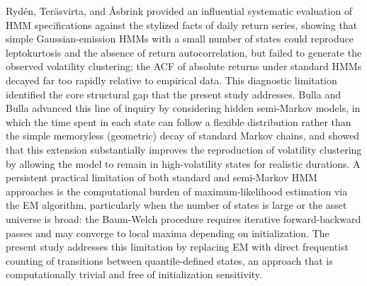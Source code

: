 Ryd\'{e}n, Ter\"{a}svirta, and \AA sbrink \cite{ryden_stylized_1998} provided an influential systematic evaluation of HMM specifications against the stylized facts of daily return series, showing that simple Gaussian-emission HMMs with a small number of states could reproduce leptokurtosis and the absence of return autocorrelation, but failed to generate the observed volatility clustering; the ACF of absolute returns under standard HMMs decayed far too rapidly relative to empirical data. This diagnostic limitation identified the core structural gap that the present study addresses. Bulla and Bulla \cite{bulla_stylized_2006} advanced this line of inquiry by considering hidden semi-Markov models, in which the time spent in each state can follow a flexible distribution rather than the simple memoryless (geometric) decay of standard Markov chains, and showed that this extension substantially improves the reproduction of volatility clustering by allowing the model to remain in high-volatility states for realistic durations. A persistent practical limitation of both standard and semi-Markov HMM approaches is the computational burden of maximum-likelihood estimation via the EM algorithm, particularly when the number of states is large or the asset universe is broad: the Baum-Welch procedure requires iterative forward-backward passes and may converge to local maxima depending on initialization. The present study addresses this limitation by replacing EM with direct frequentist counting of transitions between quantile-defined states, an approach that is computationally trivial and free of initialization sensitivity.

